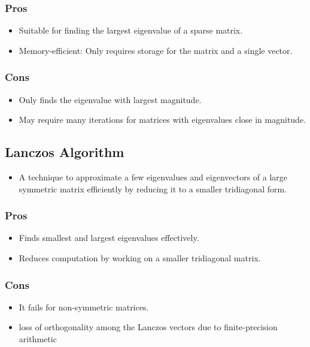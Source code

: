 \documentclass[journal]{IEEEtran}
\begin{document}
\subsubsection{Pros}
\begin{itemize}
    \item Suitable for finding the largest eigenvalue of a sparse matrix.
    \item Memory-efficient: Only requires storage for the matrix and a single vector.
\end{itemize}
\subsubsection{Cons}
\begin{itemize}
    \item Only finds the eigenvalue with largest magnitude.
    \item May require many iterations for matrices with eigenvalues close in magnitude.
    
\end{itemize}
\subsection{Lanczos Algorithm}
\begin{itemize}
    \item A technique to approximate a few eigenvalues and eigenvectors of a large symmetric matrix efficiently by reducing it to a smaller tridiagonal form.\\
\end{itemize}
\subsubsection{Pros}
\begin{itemize}
    \item Finds smallest and largest eigenvalues effectively.
    \item Reduces computation by working on a smaller tridiagonal matrix.
\end{itemize}
\subsubsection{Cons}
\begin{itemize}
    \item It fails for non-symmetric matrices.
    \item loss of orthogonality among the Lanczos vectors due to finite-precision arithmetic
\end{itemize}
\end{document}
